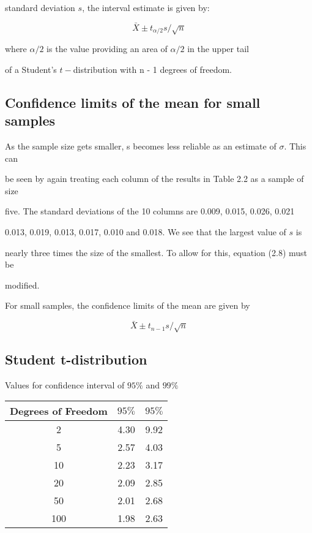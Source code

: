 standard deviation $s$, the interval estimate is given by:

\[ \bar{X} \pm t_{\alpha/2}s /\sqrt{n} \]

where $\alpha/2$ is the value providing an area of $\alpha/2$  in the upper tail

of a Student's $t-$distribution with n - 1 degrees of freedom.

 



\subsection{Confidence limits of the mean for small samples}

 

As the sample size gets smaller, s becomes less reliable as an estimate of $\sigma$. This can

be seen by again treating each column of the results in Table 2.2 as a sample of size

five. The standard deviations of the 10 columns are 0.009, 0.015, 0.026, 0.021

0.013, 0.019, 0.013, 0.017, 0.010 and 0.018. We see that the largest value of $s$ is

nearly three times the size of the smallest. To allow for this, equation (2.8) must be

modified.

 

For small samples, the confidence limits of the mean are given by

\[ \bar{X} \pm t_{n-1}s /\sqrt{n} \]

 



\subsection{Student t-distribution}

 

Values for confidence interval of $95\%$ and $99\%$

\begin{tabular}{|c|c|c|}

  \hline


  Degrees of Freedom & $95\%$ & $95\%$ \\ \hline

  2 & 4.30 & 9.92 \\

  5 & 2.57  & 4.03 \\

  10 & 2.23 & 3.17 \\

  20 & 2.09 & 2.85 \\

  50 & 2.01 & 2.68 \\

  100 & 1.98 & 2.63 \\

  \hline

\end{tabular}

